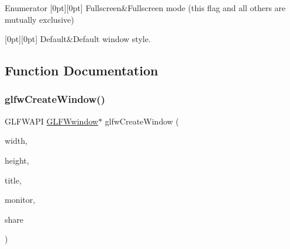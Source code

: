 \begin{DoxyEnumFields}{Enumerator}
[0pt][0pt]{}\mbox{\label{group__window_ggaf9d60653457de8820877e8edeb7a9839a6288ec86830245cf957e2d234f79f50d}} 
Fullscreen&Fullscreen mode (this flag and all others are mutually exclusive) \\
\hline

[0pt][0pt]{}\mbox{\label{group__window_ggaf9d60653457de8820877e8edeb7a9839a5597cd420fc461807e4a201c92adea37}} 
Default&Default window style. \\
\hline

\end{DoxyEnumFields}


\subsection{Function Documentation}
\mbox{\label{group__window_ga680a02abe0e4494b6759d5703240713e}} 
\subsubsection{\texorpdfstring{glfw\+Create\+Window()}{glfwCreateWindow()}}
{\footnotesize\ttfamily G\+L\+F\+W\+A\+PI \hyperlink{group__window_ga3c96d80d363e67d13a41b5d1821f3242}{G\+L\+F\+Wwindow}$\ast$ glfw\+Create\+Window (\begin{DoxyParamCaption}\item[{int}]{width,  }\item[{int}]{height,  }\item[{const char $\ast$}]{title,  }\item[{\hyperlink{group__monitor_ga8d9efd1cde9426692c73fe40437d0ae3}{G\+L\+F\+Wmonitor} $\ast$}]{monitor,  }\item[{\hyperlink{group__window_ga3c96d80d363e67d13a41b5d1821f3242}{G\+L\+F\+Wwindow} $\ast$}]{share }\end{DoxyParamCaption})}



